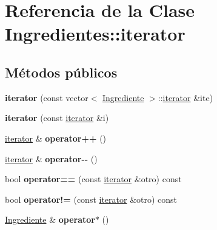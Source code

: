 \hypertarget{classIngredientes_1_1iterator}{}\section{Referencia de la Clase Ingredientes\+:\+:iterator}
\label{classIngredientes_1_1iterator}
\subsection*{Métodos públicos}
\begin{DoxyCompactItemize}
\item 
\mbox{\label{classIngredientes_1_1iterator_a7691dcc6dc16d3f7f03027e360c1e36a}} 
{\bfseries iterator} (const vector$<$ \hyperlink{classIngrediente}{Ingrediente} $>$\+::\hyperlink{classIngredientes_1_1iterator}{iterator} \&ite)
\item 
\mbox{\label{classIngredientes_1_1iterator_abbb7d28d76c74eef752c8b87f1591401}} 
{\bfseries iterator} (const \hyperlink{classIngredientes_1_1iterator}{iterator} \&i)
\item 
\mbox{\label{classIngredientes_1_1iterator_afc3cec14af8dad173afab85ad29e04e5}} 
\hyperlink{classIngredientes_1_1iterator}{iterator} \& {\bfseries operator++} ()
\item 
\mbox{\label{classIngredientes_1_1iterator_ac201c4291be38d5c5f0ce85b189ae029}} 
\hyperlink{classIngredientes_1_1iterator}{iterator} \& {\bfseries operator-\/-\/} ()
\item 
\mbox{\label{classIngredientes_1_1iterator_a4291dbe0bccf057dde3f05015dbd82fd}} 
bool {\bfseries operator==} (const \hyperlink{classIngredientes_1_1iterator}{iterator} \&otro) const
\item 
\mbox{\label{classIngredientes_1_1iterator_a806695c7cbce0748532f935de9ad1ac9}} 
bool {\bfseries operator!=} (const \hyperlink{classIngredientes_1_1iterator}{iterator} \&otro) const
\item 
\mbox{\label{classIngredientes_1_1iterator_ae0a925e6da382460e59d85aa21984930}} 
\hyperlink{classIngrediente}{Ingrediente} \& {\bfseries operator$\ast$} ()
\end{DoxyCompactItemize}
